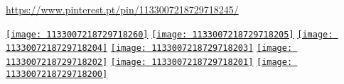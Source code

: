 \url{https://www.pinterest.pt/pin/1133007218729718245/}

\vspace*{0.2in}
\begin{multicols}{2}
\href{https://i.pinimg.com/originals/2b/21/d2/2b21d2e5704ea2853d5fd84d28f13e4d.jpg}{\texttt{[image: 1133007218729718260]}}
\href{https://i.pinimg.com/originals/d9/99/de/d999defd689a7ad25af906177649f987.jpg}{\texttt{[image: 1133007218729718205]}}
\href{https://i.pinimg.com/originals/33/81/09/33810993544942573aaa1694c923aff3.jpg}{\texttt{[image: 1133007218729718204]}}
\href{https://i.pinimg.com/originals/f0/91/fc/f091fc87f81b450834a615347a056764.jpg}{\texttt{[image: 1133007218729718203]}}
\href{https://i.pinimg.com/originals/04/96/91/0496911a8663e417127f6e92f691c684.jpg}{\texttt{[image: 1133007218729718202]}}
\href{https://i.pinimg.com/originals/86/42/d7/8642d7b883df308954ffcc6a0d42cd51.jpg}{\texttt{[image: 1133007218729718201]}}
\href{https://i.pinimg.com/originals/e5/63/ea/e563eadf806ba73536b6018a587402b8.jpg}{\texttt{[image: 1133007218729718200]}}
\end{multicols}
